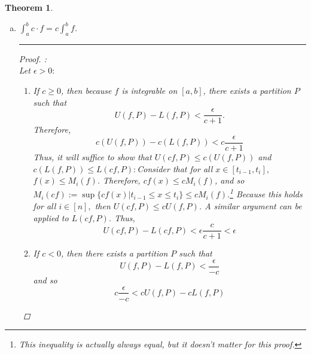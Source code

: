 \documentclass[openany, amssymb, psamsfonts]{amsart}
\newtheorem{thm}{Theorem}[section]
\theoremstyle{definition}
\numberwithin{equation}{section}
\begin{document}
\begin{thm}
\begin{enumerate}[(a)]
\begin{proof}
\begin{enumerate}
    \item Let $\Omega_f = \int_a^bf.$ Therefore, by Lemma \ref{13.20}, there exists a partition $P_f$ such that \[U(f,P_f) - \Omega_f < \frac{\epsilon}{2} \quad \text{and} \quad \Omega_f - L(f,P_f)< \frac{\epsilon}{2}.\] 
    \item Let $\Omega_g = \int_a^bg.$ Therefore, by Lemma \ref{13.20}, there exists a partition $P_g$ such that \[U(g,P_g) - \Omega_g < \frac{\epsilon}{2} \quad \text{and} \quad \Omega_g - L(f,P_g)< \frac{\epsilon}{2}.\] 
\end{enumerate}
Thus, for all $\epsilon>0$, there exists a $P:= P_f \cup P_g$ such that, by identical logic as in the above part:
\[U(f,P) - \Omega_f + U(g,P) - \Omega_g = U(f+g, P) - (\Omega_f + \Omega_g) < \frac{\epsilon}{2}+ \frac{\epsilon}{2} = \epsilon\]
and similary, 
\[(\Omega_f + \Omega_g)-L(f+g, P) <\epsilon\]
Therefore, by Lemma \ref{13.20}, $\Omega_f + \Omega_g = \int_a^b (f+g)$ and so 
\[\displaystyle \int_{a}^{b} (f + g) = \int_{a}^{b} f + \int_{a}^{b} g.\]
\end{proof}\vspace{4pt}     \hrule   \vspace{4pt} 
		\item $\displaystyle \int_{a}^{b} c \cdot f = c \int_{a}^{b} f$.
\vspace{4pt}     \hrule   \vspace{4pt} \begin{proof}:\\
Let $\epsilon>0:$
    \begin{enumerate}
        \item If $c\geq 0$, then because $f$ is integrable on $[a,b]$, there exists a partition $P$ such that \[U(f,P) - L(f,P)< \frac{\epsilon}{c+1}.\] Therefore, \[c(U(f,P)) - c(L(f,P))< c\frac{\epsilon}{c+1}\] Thus, it will suffice to show that $U(cf,P)\leq c(U(f,P))$ and $c(L(f,P))\leq L(cf,P):$\newline Consider that for all $x\in [t_{i-1}, t_i],$ $f(x)\leq M_i(f)$. Therefore, $cf(x) \leq cM_i(f)$, and so $M_i(cf):=\sup\{cf(x)|t_{i-1}\leq x \leq t_i\}\leq cM_i(f).$\footnote{This inequality is actually always equal, but it doesn't matter for this proof.} Because this holds for all $i\in [n],$ then $U(cf,P)\leq cU(f,P)$. A similar argument can be applied to $L(cf,P)$. Thus, \[U(cf,P) - L(cf,P)< \epsilon\frac{c}{c+1}<\epsilon\]
        \item If $c<0$, then there exists a partition $P$ such that \[U(f,P) - L(f,P)< \frac{\epsilon}{-c}\] and so \[c\frac{\epsilon}{-c}<cU(f,P) - cL(f,P)\] 

\end{enumerate}
\end{proof}
\end{enumerate}
\end{thm}
\end{document}
